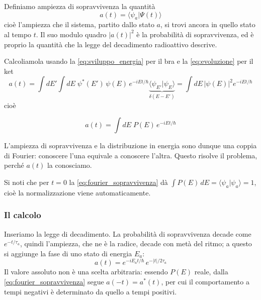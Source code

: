 Definiamo ampiezza di sopravvivenza la quantità
%
\begin{equation}
    a(t) = \langle \psi_a | \Psi(t) \rangle
\end{equation}
cioè l'ampiezza che il sistema, partito dallo stato $a$, si trovi ancora in quello stato al tempo $t$. Il suo modulo quadro $|a(t)|^2$ è la probabilità di sopravvivenza, ed è proprio la quantità che la legge del decadimento radioattivo descrive.

Calcoliamola usando la \eqref{eq:sviluppo_energia} per il bra e la \eqref{eq:evoluzione} per il ket
%
\begin{equation}
    a(t) = \int dE' \int dE \; \psi^*(E') \, \psi(E) \, e^{-iEt/\hbar} \underbrace{\langle \psi_{E'}|\psi_E\rangle}_{\delta(E-E')} = \int dE \, |\psi(E)|^2 e^{-iEt/\hbar}
\end{equation}
cioè

\begin{tcolorbox}[colback=black!5!white, colframe=black!45!white, boxrule=0.8pt]
\begin{equation}
    a(t) = \int dE \; P(E) \, e^{-iEt/\hbar}
    \label{eq:fourier_sopravvivenza}
\end{equation}
\end{tcolorbox}
L'ampiezza di sopravvivenza e la distribuzione in energia sono dunque una coppia di Fourier: conoscere l'una equivale a conoscere l'altra. Questo risolve il problema, perché $a(t)$ la conosciamo.

Si noti che per $t = 0$ la \eqref{eq:fourier_sopravvivenza} dà $\int P(E)\,dE = \langle \psi_a | \psi_a\rangle = 1$, cioè la normalizzazione viene automaticamente.

\subsubsection*{Il calcolo}

Inseriamo la legge di decadimento. La probabilità di sopravvivenza decade come $e^{-t/\tau_a}$, quindi l'ampiezza, che ne è la radice, decade con metà del ritmo; a questo si aggiunge la fase di uno stato di energia $E_a$:
%
\begin{equation}
    a(t) = e^{-iE_a t/\hbar} \, e^{-|t|/2\tau_a}
\end{equation}
Il valore assoluto non è una scelta arbitraria: essendo $P(E)$ reale, dalla \eqref{eq:fourier_sopravvivenza} segue $a(-t) = a^*(t)$, per cui il comportamento a tempi negativi è determinato da quello a tempi positivi.

